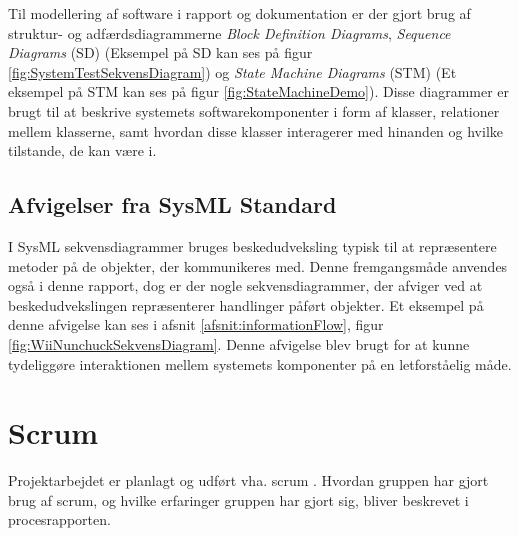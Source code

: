 \noindent Til modellering af software i rapport og dokumentation er der gjort brug af struktur- og adfærdsdiagrammerne \textit{Block Definition Diagrams}, \textit{Sequence Diagrams} (SD) (Eksempel på SD kan ses på figur \ref{fig:SystemTestSekvensDiagram}) og \textit{State Machine Diagrams} (STM) (Et eksempel på STM kan ses på figur \ref{fig:StateMachineDemo}). Disse diagrammer er brugt til at beskrive systemets softwarekomponenter i form af klasser, relationer mellem klasserne, samt hvordan disse klasser interagerer med hinanden og hvilke tilstande, de kan være i. 

\subsection{Afvigelser fra SysML Standard}
I SysML sekvensdiagrammer bruges beskedudveksling typisk til at repræsentere metoder på de objekter, der kommunikeres med. Denne fremgangsmåde anvendes også i denne rapport, dog er der nogle sekvensdiagrammer, der afviger ved at beskedudvekslingen repræsenterer handlinger påført objekter. Et eksempel på denne afvigelse kan ses i afsnit \ref{afsnit:informationFlow}, figur \ref{fig:WiiNunchuckSekvensDiagram}. Denne afvigelse blev brugt for at kunne tydeliggøre interaktionen mellem systemets komponenter på en letforståelig måde.

\section{Scrum}
Projektarbejdet er planlagt og udført vha. scrum \cite{scrum}. Hvordan gruppen har gjort brug af scrum, og hvilke erfaringer gruppen har gjort sig, bliver beskrevet i procesrapporten.